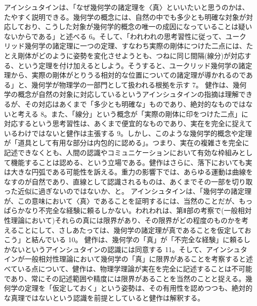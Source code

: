 \documentclass{article}
\begin{document}
アインシュタインは、「なぜ幾何学の諸定理を〈真〉といいたいと思うのかは、たやすく説明できる。幾何学の概念には、自然の中でも多少とも明確な対象が対応しており、こうした対象が幾何学的概念の唯一の成因になっていることは疑いないからである」と述べる 6。そして、「われわれの思考習性に従って、ユークリッド幾何学の諸定理に一つの定理、すなわち実際の剛体につけた二点には、たとえ剛体がどのように姿勢を変化させようとも、つねに同じ間隔(線分)が対応する、という定理を付け加えるとしよう。そうすると、ユークリッド幾何学の諸定理から、実際の剛体がとりうる相対的な位置についての諸定理が導かれるのである」と、幾何学が物理学の一部門として扱われる根拠を示す 7。
健作は、幾何学の概念が自然の対象に対応しているというアインシュタインの指摘は理解できるが、その対応はあくまで「多少とも明確な」ものであり、絶対的なものではないと考える 8。また、「線分」という概念が「実際の剛体に印をつけた二点」に対応するという思考習性は、あくまで便宜的なものであり、実在を完全に捉えているわけではないと健作は主張する 9。しかし、このような幾何学的概念や定理が「道具として有用な部分は内包的に認める」。つまり、実在の複雑さを完全に記述できなくとも、人間の認識やコミュニケーションにおいて有効な枠組みとして機能することは認める、という立場である。健作はさらに、落下においても実は大きな円弧である可能性を訴える。重力の影響下では、あらゆる運動は曲線をなすのが自然であり、直線として認識されるものは、あくまでその一部を切り取った近似に過ぎないのではないか、と。
アインシュタインは、「幾何学の諸定理が、この意味において〈真〉であることを証明するには、当然のことだが、もっぱらかなり不完全な経験に頼るしかない。われわれは、第Ⅱ部の考察で(一般相対性理論において)それらの真には限界があり、その限界がどの程度のものかを考えることにして、さしあたっては、幾何学の諸定理が真であることを仮定しておこう」と結んでいる 10。
健作は、幾何学の「真」が「不完全な経験」に頼るしかないというアインシュタインの認識には同意する 11。そして、アインシュタインが一般相対性理論において幾何学の「真」に限界があることを考察すると述べている点について、健作は、物理学理論が実在を完全に記述することは不可能であり、常にその記述範囲や精度には限界があることを当然のことと捉える。幾何学の定理を「仮定しておく」という姿勢は、その有用性を認めつつも、絶対的な真理ではないという認識を前提としていると健作は解釈する。
\end{document}
